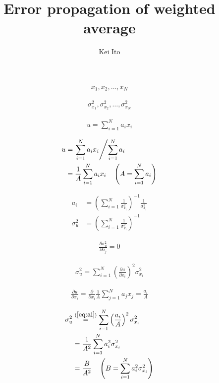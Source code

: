 \documentclass[20pt]{extarticle}
\title{Error propagation of weighted average}
\author{Kei Ito}
\begin{document}
\begin{align}
    x_{1}, x_{2}, \hdots, x_{N}
\end{align}

\begin{align}
    \sigma_{x_{1}}^{2}, \sigma_{x_{2}}^{2}, \hdots, \sigma_{x_{N}}^{2}
\end{align}

\begin{align}
    u = \sum_{i=1}^{N}a_{i}x_{i}
\end{align}

\begin{align}
    u
    &= \left.\sum_{i=1}^{N}a_{i}x_{i} \middle/ \sum_{i=1}^{N}a_{i}\right.\\
    \label{eq:defA}
    &= \frac{1}{A}\sum_{i=1}^{N}a_{i}x_{i}
    \hspace{1em}\left(A = \sum_{i=1}^{N}a_{i}\right)
\end{align}

\begin{align}
    a_{i}
    &=\left(\sum_{i=1}^{N}\frac{1}{\sigma_{x_{i}}^{2}}\right)^{-1}\frac{1}{\sigma_{x_{i}}^{2}}\\
    \sigma_{u}^{2}
    &= \left(\sum_{i=1}^{N}\frac{1}{\sigma_{x_{i}}^{2}}\right)^{-1}
\end{align}

\begin{align}\label{eq:zero}
    \frac{\partial \sigma_{u}^{2}}{\partial a_{j}}=0
\end{align}

\begin{align}
    \sigma_{u}^{2}=\sum_{i=1}^{N}\left(\frac{\partial u}{\partial x_{i}}\right)^{2}\sigma_{x_{i}}^{2}
\end{align}

\begin{align}
    \label{eq:ai}
    \frac{\partial u}{\partial x_{i}}
    =\frac{\partial}{\partial x_{i}}\frac{1}{A}\sum_{j=1}^{N}a_{j}x_{j}
    =\frac{a_{i}}{A}
\end{align}

\begin{align}
    \sigma_{u}^{2}
    &\overset{(\ref{eq:ai})}{=}\sum_{i=1}^{N}\left(\frac{a_{i}}{A}\right)^{2}\sigma_{x_{i}}^{2}\\
    &=\frac{1}{A^{2}}\sum_{i=1}^{N}a_{i}^{2}\sigma_{x_{i}}^{2}\\
    \label{eq:defB}
    &=\frac{B}{A^{2}}
    \hspace{1em}\left(B = \sum_{i=1}^{N}a_{i}^{2}\sigma_{x_{i}}^{2}\right)
\end{align}
\end{document}
